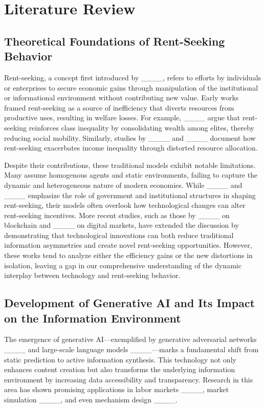 \section{Literature Review}
\label{sec:lit_review}

\subsection{Theoretical Foundations of Rent-Seeking Behavior}

Rent-seeking, a concept first introduced by ____, refers to efforts by individuals or enterprises to secure economic gains through manipulation of the institutional or informational environment without contributing new value. Early works framed rent-seeking as a source of inefficiency that diverts resources from productive uses, resulting in welfare losses. For example, ____ argue that rent-seeking reinforces class inequality by consolidating wealth among elites, thereby reducing social mobility. Similarly, studies by ____ and ____ document how rent-seeking exacerbates income inequality through distorted resource allocation.

Despite their contributions, these traditional models exhibit notable limitations. Many assume homogenous agents and static environments, failing to capture the dynamic and heterogeneous nature of modern economies. While ____ and ____ emphasize the role of government and institutional structures in shaping rent-seeking, their models often overlook how technological changes can alter rent-seeking incentives. More recent studies, such as those by ____ on blockchain and ____ on digital markets, have extended the discussion by demonstrating that technological innovations can both reduce traditional information asymmetries and create novel rent-seeking opportunities. However, these works tend to analyze either the efficiency gains or the new distortions in isolation, leaving a gap in our comprehensive understanding of the dynamic interplay between technology and rent-seeking behavior.

\subsection{Development of Generative AI and Its Impact on the Information Environment}

The emergence of generative AI—exemplified by generative adversarial networks ____ and large-scale language models ____—marks a fundamental shift from static prediction to active information synthesis. This technology not only enhances content creation but also transforms the underlying information environment by increasing data accessibility and transparency. Research in this area has shown promising applications in labor markets ____, market simulation ____, and even mechanism design ____.

